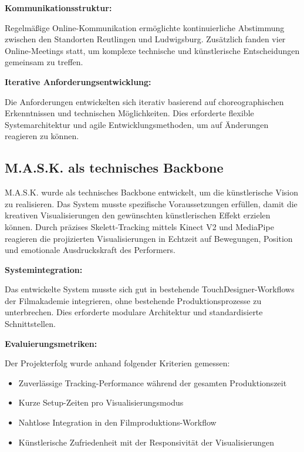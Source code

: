 \textbf{Kommunikationsstruktur:}

Regelmäßige Online-Kommunikation ermöglichte kontinuierliche Abstimmung zwischen den Standorten Reutlingen und Ludwigsburg. Zusätzlich fanden vier Online-Meetings statt, um komplexe technische und künstlerische Entscheidungen gemeinsam zu treffen.

\textbf{Iterative Anforderungsentwicklung:}

Die Anforderungen entwickelten sich iterativ basierend auf choreographischen Erkenntnissen und technischen Möglichkeiten. Dies erforderte flexible Systemarchitektur und agile Entwicklungsmethoden, um auf Änderungen reagieren zu können.

\subsection{M.A.S.K. als technisches Backbone}

M.A.S.K. wurde als technisches Backbone entwickelt, um die künstlerische Vision zu realisieren. Das System musste spezifische Voraussetzungen erfüllen, damit die kreativen Visualisierungen den gewünschten künstlerischen Effekt erzielen können. Durch präzises Skelett-Tracking mittels Kinect V2 und MediaPipe reagieren die projizierten Visualisierungen in Echtzeit auf Bewegungen, Position und emotionale Ausdruckskraft des Performers.

\textbf{Systemintegration:}

Das entwickelte System musste sich gut in bestehende TouchDesigner-Workflows der Filmakademie integrieren, ohne bestehende Produktionsprozesse zu unterbrechen. Dies erforderte modulare Architektur und standardisierte Schnittstellen.

\textbf{Evaluierungsmetriken:}

Der Projekterfolg wurde anhand folgender Kriterien gemessen:
\begin{itemize}
    \item Zuverlässige Tracking-Performance während der gesamten Produktionszeit
    \item Kurze Setup-Zeiten pro Visualisierungsmodus
    \item Nahtlose Integration in den Filmproduktions-Workflow
    \item Künstlerische Zufriedenheit mit der Responsivität der Visualisierungen
\end{itemize}